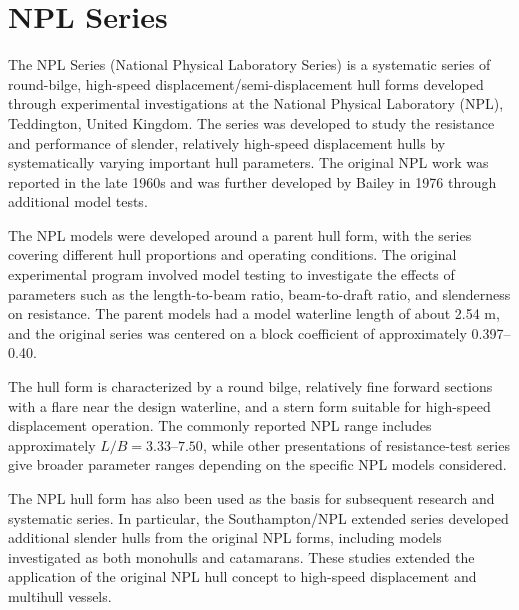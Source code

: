 \documentclass[12pt,a4paper,twoside]{report}
\begin{document}
\section{NPL Series}
The NPL Series (National Physical Laboratory Series) is a systematic series of round-bilge, high-speed displacement/semi-displacement hull forms developed through experimental investigations at the National Physical Laboratory (NPL), Teddington, United Kingdom. The series was developed to study the resistance and performance of slender, relatively high-speed displacement hulls by systematically varying important hull parameters. The original NPL work was reported in the late 1960s and was further developed by Bailey in 1976 through additional model tests. \cite{sahoo2011resistance}
\vspace{\baselineskip}\par\noindent The NPL models were developed around a parent hull form, with the series covering different hull proportions and operating conditions. The original experimental program involved model testing to investigate the effects of parameters such as the length-to-beam ratio, beam-to-draft ratio, and slenderness on resistance. The parent models had a model waterline length of about 2.54 m, and the original series was centered on a block coefficient of approximately 0.397–0.40. \cite{sahoo2011resistance}
\vspace{\baselineskip}\par\noindent The hull form is characterized by a round bilge, relatively fine forward sections with a flare near the design waterline, and a stern form suitable for high-speed displacement operation. The commonly reported NPL range includes approximately \(L/B = 3.33–7.50\), while other presentations of resistance-test series give broader parameter ranges depending on the specific NPL models considered. 
\vspace{\baselineskip}\par\noindent The NPL hull form has also been used as the basis for subsequent research and systematic series. In particular, the Southampton/NPL extended series developed additional slender hulls from the original NPL forms, including models investigated as both monohulls and catamarans. These studies extended the application of the original NPL hull concept to high-speed displacement and multihull vessels.
\end{document}
